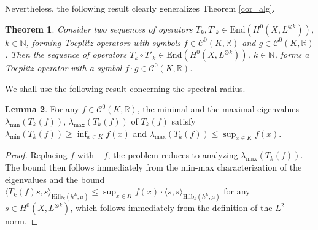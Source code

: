 \documentclass[12pt]{article}
\numberwithin{equation}{section}
\theoremstyle{theorem}
\newtheorem{thm}{Theorem}[section]
\theoremstyle{definition}
\newtheorem{lem}[thm]{Lemma}
\theoremstyle{remark}
\newcommand{\real}{\mathbb{R}}
\newcommand{\nat}{\mathbb{N}}
\newcommand{\enmr}[1]{\text{End}{(#1)}}
\newcommand{\ccal}{\mathscr{C}}
\begin{document}
	Nevertheless, the following result clearly generalizes Theorem \ref{cor_alg}.
	\begin{thm}\label{cor_prod_toepl}
		Consider two sequences of operators $T_k, T'_k \in {\enmr{H^0(X, L^{\otimes k})}}$, $k \in \nat$, forming Toeplitz operators with symbols $f \in \ccal^0(K, \real)$ and $g \in \ccal^0(K, \real)$.
		Then the sequence of operators $T_k \circ T'_k \in {\enmr{H^0(X, L^{\otimes k})}}$, $k \in \nat$, forms a Toeplitz operator with a symbol $f \cdot g \in \ccal^0(K, \real)$.
	\end{thm}
	We shall use the following result concerning the spectral radius.
	\begin{sloppypar}
	\begin{lem}\label{lem_spec_radius}
		For any $f \in \ccal^0(K, \real)$, the minimal and the maximal eigenvalues $\lambda_{\min}(T_k(f))$, $\lambda_{\max}(T_k(f))$ of $T_k(f)$ satisfy $\lambda_{\min}(T_k(f)) \geq \inf_{x \in K} f(x)$ and $\lambda_{\max}(T_k(f)) \leq \sup_{x \in K} f(x)$.
	\end{lem}
	\begin{proof}
		Replacing $f$ with $-f$, the problem reduces to analyzing $\lambda_{\max}(T_k(f))$.
		The bound then follows immediately from the min-max characterization of the eigenvalues and the bound $\langle T_k(f) s, s \rangle_{{\textrm{Hilb}}_k(h^L, \mu)} \leq \sup_{x \in K} f(x) \cdot \langle s, s \rangle_{{\textrm{Hilb}}_k(h^L, \mu)}$ for any $s \in H^0(X, L^{\otimes k})$, which follows immediately from the definition of the $L^2$-norm.
	\end{proof}
	\end{sloppypar}
\end{document}
